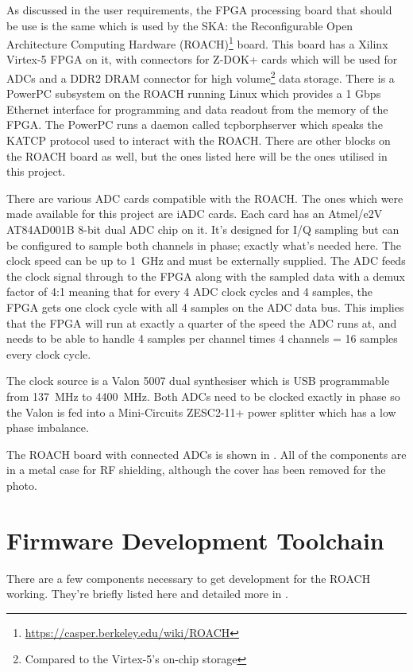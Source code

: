 As discussed in the user requirements, the FPGA processing board that should be use is the same which is used by the SKA: the Reconfigurable Open Architecture Computing Hardware (ROACH)\footnote{\url{https://casper.berkeley.edu/wiki/ROACH}} board. This board has a Xilinx Virtex-5 FPGA on it, with connectors for Z-DOK+ cards which will be used for ADCs and a DDR2 DRAM connector for high volume\footnote{Compared to the Virtex-5's on-chip storage} data storage. There is a PowerPC subsystem on the ROACH running Linux which provides a 1 Gbps Ethernet interface for programming and data readout from the memory of the FPGA. The PowerPC runs a daemon called tcpborphserver which speaks the KATCP protocol used to interact with the ROACH. There are other blocks on the ROACH board as well, but the ones listed here will be the ones utilised in this project.

There are various ADC cards compatible with the ROACH. The ones which were made available for this project are iADC cards. Each card has an Atmel/e2V AT84AD001B 8-bit dual ADC chip on it. It's designed for I/Q sampling but can be configured to sample both channels in phase; exactly what's needed here. The clock speed can be up to \SI{1}{\giga\hertz} and must be externally supplied. The ADC feeds the clock signal through to the FPGA along with the sampled data with a demux factor of 4:1 meaning that for every 4 ADC clock cycles and 4 samples, the FPGA gets one clock cycle with all 4 samples on the ADC data bus. This implies that the FPGA will run at exactly a quarter of the speed the ADC runs at, and needs to be able to handle 4 samples per channel times 4 channels = 16 samples every clock cycle.

The clock source is a Valon 5007 dual synthesiser which is USB programmable from \SI{137}{\mega\hertz} to \SI{4400}{\mega\hertz}. Both ADCs need to be clocked exactly in phase so the Valon is fed into a Mini-Circuits ZESC2-11+ power splitter which has a low phase imbalance.

The ROACH board with connected ADCs is shown in . All of the components are in a metal case for RF shielding, although the cover has been removed for the photo.


\section{Firmware Development Toolchain}
There are a few components necessary to get development for the ROACH working. They're briefly listed here and detailed more in .\\

